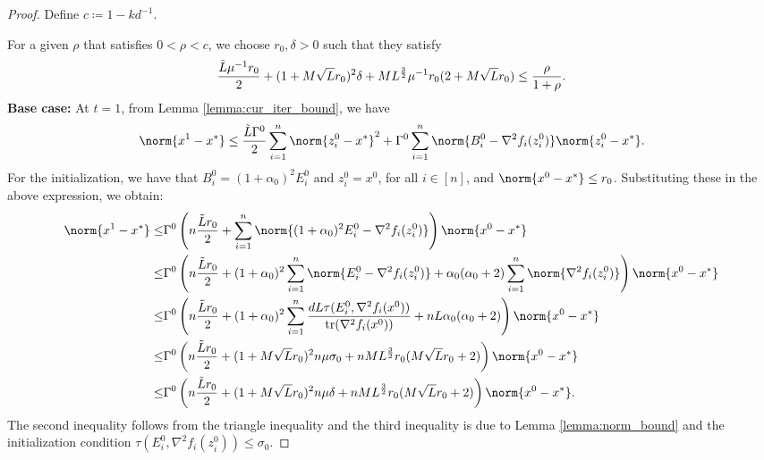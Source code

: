 \begin{proof}
    Define $c \coloneqq 1 - k d^{-1}$.

    For a given $\rho$ that satisfies $0 < \rho < c$, we choose $r_0, \delta > 0$ such that they satisfy
    \begin{equation}
          \frac{\Tilde{L} \mu^{-1} r_0 }{ 2 } +  (1 + M \sqrt{L} r_0 )^2  \delta  +  M L^{\frac{3}{2}} \mu^{-1} r_0  (2 + M \sqrt{L}  r_0 ) \leq \frac{\rho}{ 1 + \rho}.
         \label{rho_condition}
    \end{equation}
    \textbf{Base case:} At $t=1$, from Lemma \ref{lemma:cur_iter_bound}, we have
    \begin{equation*}
        \norm{x^1 - x^*} \leq \frac{\Tilde{L}\Gamma^0}{2} \sum_{i=1}^n \norm{z_i^0 - x^*}^2 + \Gamma^0 \sum_{i=1}^n \norm{B_i^0 - \nabla^2 f_i (z_i^0)} \norm{z_i^0 - x^*}.
    \end{equation*}
    For the initialization, we have that $B_i^0 = (1 + \alpha_0)^2 E_i^0$ and $z_i^0 = x^0$, for all $i \in [n]$, and $\norm{x^0 - x^*} \leq r_0$. Substituting these in the above expression, we obtain:
    \begin{align*}
        \norm{x^1 - x^*} \leq & \Gamma^0 \left(n\frac{\Tilde{L} r_0}{2} + \sum_{i=1}^n \norm{(1 + \alpha_0)^2 E_i^0 - \nabla^2 f_i (z_i^0)}\right) \norm{x^0 - x^*} \\
        \leq & \Gamma^0 \left(n\frac{\Tilde{L} r_0}{2} + (1 + \alpha_0)^2 \sum_{i=1}^n \norm{ E_i^0 - \nabla^2 f_i (z_i^0)} + \alpha_0 (\alpha_0 + 2) \sum_{i=1}^n \norm{\nabla^2 f_i(z_i^0)}\right) \norm{x^0 - x^*} \\
         \leq & \Gamma^0 \left(n\frac{\Tilde{L} r_0}{2} + (1 + \alpha_0)^2 \sum_{i=1}^n \frac{d L \tau(E_i^0, \nabla^2 f_i(x^0))}{\mathrm{tr}(\nabla^2 f_i(x^0))} + n L \alpha_0 (\alpha_0 + 2) \right) \norm{x^0 - x^*} \\
         \leq & \Gamma^0 \left(n\frac{\Tilde{L} r_0}{2} + (1 + M \sqrt{L} r_0)^2 n \mu \sigma_0 + n M L^{\frac{3}{2}} r_0 (M \sqrt{L} r_0 + 2) \right) \norm{x^0 - x^*} \\
         \leq & \Gamma^0 \left(n\frac{\Tilde{L} r_0}{2} + (1 + M \sqrt{L} r_0)^2 n \mu \delta + n M L^{\frac{3}{2}} r_0 (M \sqrt{L} r_0 + 2) \right) \norm{x^0 - x^*}.
    \end{align*} 
    The second inequality follows from the triangle inequality and the third inequality is due to Lemma \ref{lemma:norm_bound} and the initialization condition $\tau(E_i^0, \nabla^2 f_i(z_i^0)) \leq \sigma_0$.


\end{proof}
